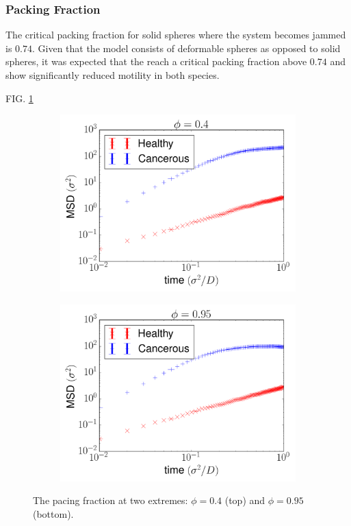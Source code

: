 \documentclass[aps,prb,twocolumn,groupedaddress,nofootinbib,floatfix]{revtex4}
\begin{document}
\subsubsection{Packing Fraction}

The critical packing fraction for solid spheres where the system becomes jammed is $0.74$.
Given that the model consists of deformable spheres as opposed to solid spheres, it was expected that the reach a critical packing fraction above $0.74$ and show significantly reduced motility in both species.

FIG. \ref{fig:phi}

\begin{figure}[h!!!!!!!!!!!!!!!!!!!!!!!!!!!!!!!!!!!!!!] %
  \begin{subfigure}{\columnwidth}
    \includegraphics[width=1.0\columnwidth]{images/phi04.png}
  \end{subfigure}
  \begin{subfigure}{\columnwidth}
    \includegraphics[width=1.0\columnwidth]{images/phi95.png}
  \end{subfigure}
  \caption{The pacing fraction at two extremes: $\phi=0.4$ (top) and $\phi=0.95$ (bottom).}
  \label{fig:phi}
\end{figure}
\end{document}
